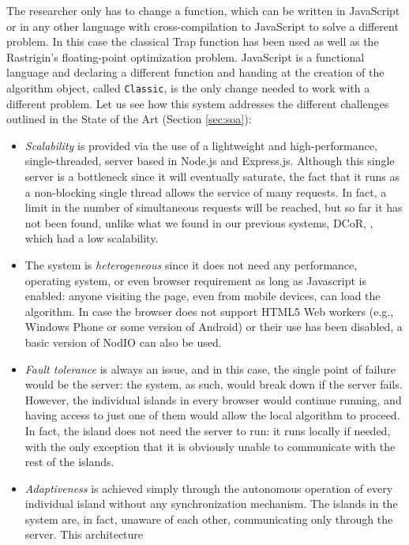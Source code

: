 \documentclass[journal,onecolumn]{IEEEtran}
\begin{document}
The researcher only has to change a function, which can be written in
JavaScript or in any other language with cross-compilation to
JavaScript \cite{web:compilersjs} to solve a different
problem. In this case the classical Trap function \cite{Ackley1987} has been
used as well as the Rastrigin's floating-point optimization
problem. JavaScript is a functional language and declaring a different 
function and handing at the creation of the algorithm object, called
{\tt Classic}, is the only change needed to work with a different
problem. Let us see how this system addresses the different challenges
outlined in the State of the Art (Section \ref{sec:soa}):
\begin{itemize}
\item {\em Scalability} is provided via the use of a lightweight and
  high-performance, single-threaded, server based in Node.js and
  Express.js. Although this single server is a bottleneck since it
  will eventually saturate, the fact that it runs as a non-blocking single thread
  allows the service of many requests. In fact, a limit in the
  number of simultaneous requests will be reached, but so far it has
  not been found, unlike what we found in our previous systems, DCoR,
  \cite{gecco07:workshop:dcor}, which had a low scalability. 
\item The system is {\em heterogeneous} since it does not need any
  performance, operating system, or even browser requirement as long
  as Javascript is enabled: anyone
  visiting the page, even from mobile devices, can load the algorithm.
  In case the browser does not support HTML5 Web workers (e.g., 
  Windows Phone or some version of Android) or their use
  has been disabled, a basic version of {\sf NodIO} can also be used.
\item {\em Fault tolerance} is always an issue, and in this case, the
  single point of failure would be the server: the system, as such,
  would break down if the server fails. However, the individual
  islands in every browser would continue running, and having access
  to just one of them would allow the local algorithm to proceed. In
  fact, the island does not need the server to run: it runs locally if
  needed, with the only exception that it is obviously unable to
  communicate with the rest of the islands.
\item {\em Adaptiveness} is achieved simply through the autonomous
  operation of every individual island without any synchronization
  mechanism. The islands in the system are, in fact, unaware of each
  other, communicating only through the server. This architecture 

\end{itemize}
\end{document}
